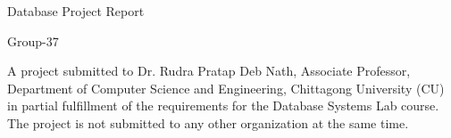 \begin{titlepage}
\begin{center}
    {\large
      Database Project Report %
    }\\
    \vspace{0.2cm}
    {\Large
      Group-37 %
      
    }
  \end{center}
  \vfill
  
  \begin{center}
  \end{center}
	\vfill
A project submitted to Dr. Rudra Pratap Deb Nath, Associate Professor, Department of Computer Science and Engineering, Chittagong University (CU) in partial fulfillment of the requirements for the Database Systems Lab course. The project is not submitted to any other organization at the same time. 

\end{titlepage}
\clearpage